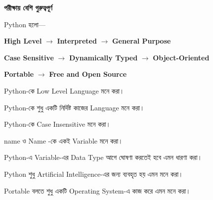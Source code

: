 
\begin{rememberbox}

\textbf{\color{deepOrange}পরীক্ষায় বেশি গুরুত্বপূর্ণ}

Python হলো—

\begin{center}

\textbf{High Level}
\(\longrightarrow\)
\textbf{Interpreted}
\(\longrightarrow\)
\textbf{General Purpose}

\medskip

\textbf{Case Sensitive}
\(\longrightarrow\)
\textbf{Dynamically Typed}
\(\longrightarrow\)
\textbf{Object-Oriented}

\medskip

\textbf{Portable}
\(\longrightarrow\)
\textbf{Free and Open Source}

\end{center}

\end{rememberbox}



\begin{compacttwocolpoints}

\item Python-কে Low Level Language মনে করা।

\item Python-কে শুধু একটি নির্দিষ্ট কাজের Language মনে করা।

\item Python-কে Case Insensitive মনে করা।

\item
\textenglish{\ttfamily name}
ও
\textenglish{\ttfamily Name}
-কে একই Variable মনে করা।

\item Python-এ Variable-এর Data Type আগে ঘোষণা করতেই হবে
এমন ধারণা করা।

\item Python শুধু Artificial Intelligence-এর জন্য ব্যবহৃত হয়
এমন মনে করা।

\item Portable বলতে শুধু একটি Operating System-এ কাজ করে
এমন মনে করা।

\end{compacttwocolpoints}

